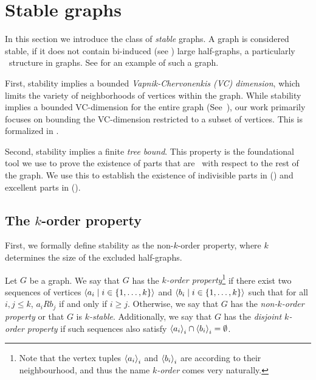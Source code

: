 \section{Stable graphs} \label{sec:section_3}

    In this section we introduce the class of \emph{stable} graphs.
    A graph is considered stable, if it does not contain bi-induced (see )
    large half-graphs, a particularly \irregular~structure in graphs.
    See  for an example of such a graph.

    

    First, stability implies a bounded \emph{Vapnik-Chervonenkis (VC) dimension}, which limits the variety of
    neighborhoods of vertices within the graph.
    While stability implies a bounded VC-dimension for the entire graph
    (See~\cite{regularity_partitions_and_the_topology_of_graphons}), our work primarily focuses on bounding
    the VC-dimension restricted to a subset of vertices.
    This is formalized in .

    Second, stability implies a finite \emph{tree bound}.
    This property is the foundational tool we use to prove the existence of parts that are \regular~with
    respect to the rest of the graph.
    We use this to establish the existence of indivisible parts in 
    () and
    excellent parts in  ().

    \subsection{The $k$-order property} \label{subsec:subsection_3.1}

        First, we formally define stability as the non-$k$-order property, where $k$ determines the size of the
        excluded half-graphs.

        \begin{definition} \label{def:k_order_property}
            Let $G$ be a graph.
            We say that $G$ has the \emph{$k$-order property}\footnote{
                Note that the vertex tuples $\left< a_i \right>_i$ and $\left< b_i \right>_i$ are  according to their neighbourhood,
                and thus the name \emph{$k$-order} comes very naturally.
            } if there exist two sequences of vertices
            $\left< a_i \mid i \in \{ 1, \dots, k \} \right>$ and $\left< b_i \mid i \in \{ 1, \dots, k \} \right>$ such that
            for all $i,j \leq k$, $a_i R b_j$ if and only if $i \geq j$.
            Otherwise, we say that $G$ has the \emph{non-$k$-order property} or that $G$ is \emph{$k$-stable}.
            Additionally, we say that $G$ has the \emph{disjoint $k$-order property} if such sequences also satisfy
            $\left< a_i \right>_i \cap \left< b_i \right>_i = \emptyset$.
        \end{definition}


